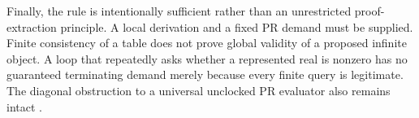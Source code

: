 Finally, the rule is intentionally sufficient rather than an unrestricted
proof-extraction principle.  A local derivation and a fixed PR demand must
be supplied.  Finite consistency of a table does not prove global validity
of a proposed infinite object.  A loop that repeatedly asks whether a
represented real is nonzero has no guaranteed terminating demand merely
because every finite query is legitimate.  The diagonal obstruction to a
universal unclocked PR evaluator also remains intact
\cite{repo-contracts,repo-embedding}.
